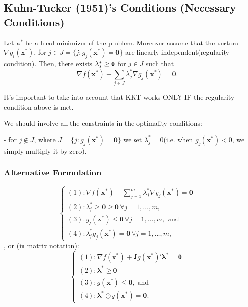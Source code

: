 \subsection{Kuhn-Tucker (1951)'s Conditions (Necessary Conditions)}

\begin{theorem}
    Let $\mathbf{x ^{*}}$ be a local minimizer of the problem. Moreover assume that the vectors $\nabla g_i(\mathbf{x ^{*}})$, for $j \in J = \{j: g_j(\mathbf{x ^{*}}) = \mathbf{0}\} $ are linearly independent(regularity condition). Then, there exists $\boldmath{\lambda_j ^{*}} \geq \mathbf{0}$ for $j \in J$ such that
    \[
        \nabla f(\mathbf{x ^{*}}) + \sum_{j \in J}\lambda_j^* \nabla g_j(\mathbf{x ^{*}}) = \mathbf{0}.
    \]
\end{theorem}

\begin{remark*}
    It's important to take into account that KKT works ONLY IF the regularity condition above is met.

    We should involve all the constraints in the optimality conditions:

    - for $j \notin J$, where $J = \{j: g_j(\mathbf{x ^{*}}) = \mathbf{0}\}$ we set $\lambda_j ^{*} = 0$(i.e. when $g_j(\mathbf{x ^{*}}) < 0$, we simply multiply it by zero).
\end{remark*}

\subsubsection{Alternative Formulation} \[
    \left\{\begin{array}{l}
        (1): \nabla f(\mathbf{x ^{*}}) + \sum_{j=1}^{m} \lambda_j^*\nabla g_j(\mathbf{x ^{*}}) = \mathbf{0} \\
        (2): \lambda_j^* \geq \mathbf{0} \geq \mathbf{0} \, \forall j = 1,\dots,m,                          \\
        (3): g_j(\mathbf{x ^{*}}) \leq \mathbf{0} \, \forall j = 1,\dots,m, \text{ and}                     \\
        (4): \lambda_j^*g_j(\mathbf{x ^{*}}) = \mathbf{0} \, \forall j = 1,\dots,m,
    \end{array}\right.
\]
, or (in matrix notation):
\[
    \left\{\begin{array}{l}
        (1): \nabla f(\mathbf{x ^{*}}) + \mathbf{J}g(\mathbf{x ^{*}})'\boldsymbol{\lambda ^{*}} = \mathbf{0} \\
        (2): \boldsymbol{\lambda ^{*}} \geq \mathbf{0}                                                       \\
        (3): g(\mathbf{x ^{*}}) \leq \mathbf{0}, \text{ and}                                                 \\
        (4): \boldsymbol{\lambda ^{*}} \odot g(\mathbf{x ^{*}}) = \mathbf{0}.
    \end{array}\right.
\]

